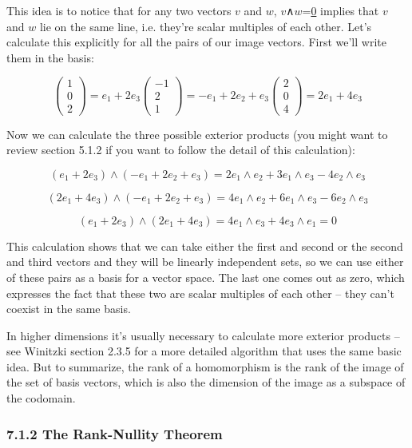 \documentclass[oneside,english]{amsbook}
\numberwithin{section}{chapter}
\theoremstyle{plain}
\theoremstyle{definition}
\begin{document}
This idea is to notice that for any two vectors $v$ and $w$,
$v$∧$w$=\ul{0} implies that $v$ and $w$ lie on the same
line, i.e. they're scalar multiples of each other. Let's calculate this
explicitly for all the pairs of our image vectors. First we'll write
them in the basis:

\[{\begin{pmatrix}
		1 \\
		0 \\
		2
	\end{pmatrix} = e_{1} + 2e_{3}
}{\begin{pmatrix}
		- 1 \\
		2 \\
		1
	\end{pmatrix} = {- e}_{1} + 2e_{2} + e_{3}
}{\begin{pmatrix}
		2 \\
		0 \\
		4
	\end{pmatrix} = 2e_{1} + 4e_{3}}\]

Now we can calculate the three possible exterior products (you might
want to review section 5.1.2 if you want to follow the detail of this
calculation):

\[\left( e_{1} + 2e_{3} \right) \land \left( {- e}_{1} + 2e_{2} + e_{3} \right) = {2e}_{1} \land e_{2} + {3e}_{1} \land e_{3} - 4e_{2} \land e_{3}\]

\[\left( 2e_{1} + 4e_{3} \right) \land \left( {- e}_{1} + 2e_{2} + e_{3} \right) = {4e}_{1} \land e_{2} + {6e}_{1} \land e_{3} - 6e_{2} \land e_{3}\]

\[\left( e_{1} + 2e_{3} \right) \land \left( 2e_{1} + 4e_{3} \right) = {4e}_{1} \land e_{3} + 4e_{3} \land e_{1} = 0\]

This calculation shows that we can take either the first and second or
the second and third vectors and they will be linearly independent sets,
so we can use either of these pairs as a basis for a vector space. The
last one comes out as zero, which expresses the fact that these two are
scalar multiples of each other -- they can't coexist in the same basis.

In higher dimensions it's usually necessary to calculate more exterior
products -- see Winitzki section 2.3.5 for a more detailed algorithm
that uses the same basic idea. But to summarize, the rank of a
homomorphism is the rank of the image of the set of basis vectors, which
is also the dimension of the image as a subspace of the codomain.

\subsubsection{7.1.2 The Rank-Nullity
	Theorem}\label{the-rank-nullity-theorem-2}
\end{document}
